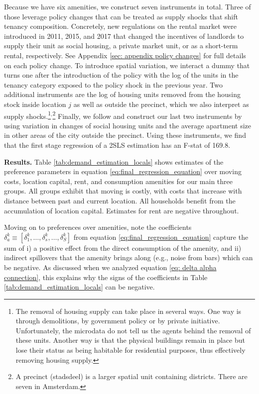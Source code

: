 \documentclass[11pt]{article}
\makeatletter
\newcommand{\Paragraph}{\vspace{0.1cm}\noindent\textbf}
\let\conditionalinput\@input
\makeatother
\begin{document}
Because we have six amenities, we construct seven instruments in total. Three of those leverage policy changes that can be treated as supply shocks that shift tenancy composition. Concretely, new regulations on the rental market were introduced in 2011, 2015, and 2017 that changed the incentives of landlords to supply their unit as social housing, a private market unit, or as a short-term rental, respectively. See Appendix \ref{sec: appendix policy changes} for full details on each policy change. To introduce spatial variation, we interact a dummy that turns one after the introduction of the policy with the log of the units in the tenancy category exposed to the policy shock in the previous year. Two additional instruments are the log of housing units removed from the housing stock inside location $j$ as well as outside the precinct, which we also interpret as supply shocks.\footnote{The removal of housing supply can take place in several ways. One way is through demolitions, by government policy or by private initiative. Unfortunately, the microdata do not tell us the agents behind the removal of these units. Another way is that the physical buildings remain in place but lose their status as being habitable for residential purposes, thus effectively removing housing supply.}$^{,}$\footnote{A precinct (stadsdeel) is a larger spatial unit containing districts. There are seven in Amsterdam.} Finally, we follow \cite{bayer2007unified} and construct our last two instruments by using variation in changes of social housing units and the average apartment size in other areas of the city outside the precinct. Using these instruments, we find that the first stage regression of a 2SLS estimation has an F-stat of 169.8.

\conditionalinput{output/tables/gmm_demand_location_choice_estimates.tex}

\Paragraph{Results.} Table \ref{tab:demand_estimation_locals} shows estimates of the preference parameters in equation \eqref{eq:final_regression_equation} over moving costs, location capital, rent, and consumption amenities for our main three groups. All groups exhibit that moving is costly, with costs that increase with distance between past and current location. All households benefit from the accumulation of location capital. Estimates for rent are negative throughout.  

Moving on to preferences over amenities, note the coefficients $\delta_{a}^k\equiv[\delta_{1}^k,\dots,\delta_{s}^k, \dots, \delta_{S}^k]$ from equation \eqref{eq:final_regression_equation} capture the sum of i) a positive effect from the direct consumption of the amenity, and ii) indirect spillovers that the amenity brings along (e.g., noise from bars) which can be negative. As discussed when we analyzed equation \eqref{eq: delta alpha connection}, this explains why the signs of the coefficients in Table \ref{tab:demand_estimation_locals} can be negative.
\end{document}
